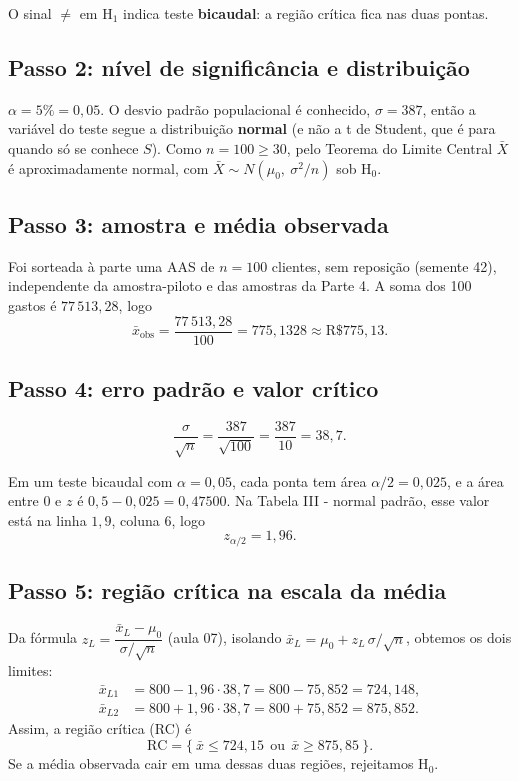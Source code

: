 \documentclass[12pt,a4paper]{article}
\begin{document}
O sinal $\neq$ em H$_1$ indica teste \textbf{bicaudal}: a região crítica fica nas duas pontas.

\subsection*{Passo 2: nível de significância e distribuição}

$\alpha = 5\% = 0{,}05$. O desvio padrão populacional é conhecido, $\sigma = 387$, então a variável do teste segue a distribuição \textbf{normal} (e não a t de Student, que é para quando só se conhece $S$). Como $n = 100 \ge 30$, pelo Teorema do Limite Central $\bar{X}$ é aproximadamente normal, com $\bar{X} \sim N(\mu_0,\ \sigma^2/n)$ sob H$_0$.

\subsection*{Passo 3: amostra e média observada}

Foi sorteada à parte uma AAS de $n = 100$ clientes, sem reposição (semente 42), independente da amostra-piloto e das amostras da Parte 4. A soma dos 100 gastos é $77\,513{,}28$, logo
$$\bar{x}_{\text{obs}} = \frac{77\,513{,}28}{100} = 775{,}1328 \approx \text{R\$ } 775{,}13.$$

\subsection*{Passo 4: erro padrão e valor crítico}

$$\frac{\sigma}{\sqrt{n}} = \frac{387}{\sqrt{100}} = \frac{387}{10} = 38{,}7.$$

Em um teste bicaudal com $\alpha = 0{,}05$, cada ponta tem área $\alpha/2 = 0{,}025$, e a área entre $0$ e $z$ é $0{,}5 - 0{,}025 = 0{,}47500$. Na Tabela III - normal padrão, esse valor está na linha $1{,}9$, coluna $6$, logo
$$z_{\alpha/2} = 1{,}96.$$

\subsection*{Passo 5: região crítica na escala da média}

Da fórmula $z_L = \dfrac{\bar{x}_L - \mu_0}{\sigma/\sqrt{n}}$ (aula 07), isolando $\bar{x}_L = \mu_0 + z_L\,\sigma/\sqrt{n}$, obtemos os dois limites:
\begin{align*}
\bar{x}_{L1} &= 800 - 1{,}96 \cdot 38{,}7 = 800 - 75{,}852 = 724{,}148,\\
\bar{x}_{L2} &= 800 + 1{,}96 \cdot 38{,}7 = 800 + 75{,}852 = 875{,}852.
\end{align*}
Assim, a região crítica (RC) é
$$\text{RC} = \{\ \bar{x} \le 724{,}15 \ \ \text{ou}\ \ \bar{x} \ge 875{,}85\ \}.$$
Se a média observada cair em uma dessas duas regiões, rejeitamos H$_0$.
\end{document}
